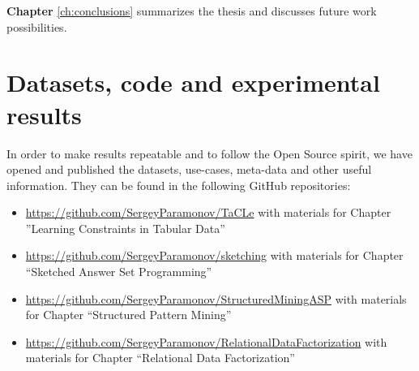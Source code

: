 \textbf{Chapter} \ref{ch:conclusions} summarizes the thesis and
discusses future work possibilities.

\section{Datasets, code and experimental results}
In order to make results repeatable and to follow the Open Source
spirit, we have opened and published the datasets, use-cases,
meta-data and other useful information.
They can be found in the following GitHub repositories:
\pubrev
\begin{itemize}
\item \url{https://github.com/SergeyParamonov/TaCLe} with materials for Chapter ''Learning Constraints in Tabular Data''
\item \url{https://github.com/SergeyParamonov/sketching} with materials for Chapter ``Sketched Answer Set Programming''
\item \url{https://github.com/SergeyParamonov/StructuredMiningASP} with materials for Chapter ``Structured Pattern Mining''

\item \url{https://github.com/SergeyParamonov/RelationalDataFactorization} with materials for Chapter ``Relational Data Factorization''
\end{itemize}
\pubrevend
\cleardoublepage
